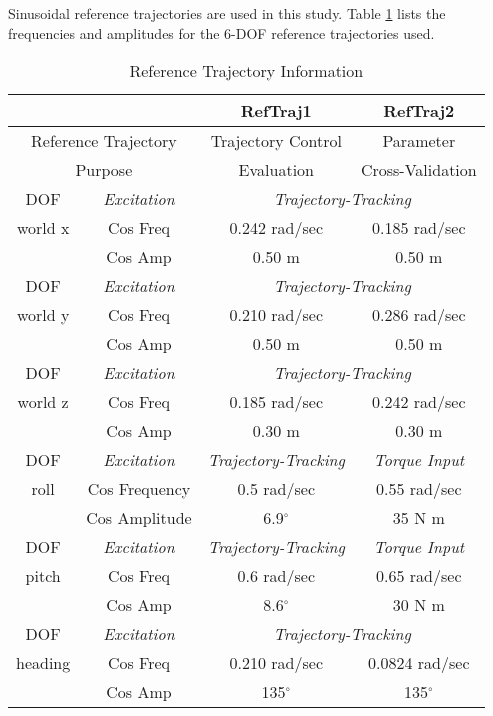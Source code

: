 Sinusoidal reference trajectories are used in this
study. 
%
Table \ref{chUV_AMBC.tb.expStat} lists the frequencies and amplitudes
for the 6-\ac{DOF} reference trajectories used.  


\begin{table}[htbp]
\ssp
\caption{Reference Trajectory Information}
\begin{center}
\begin{tabular}{cccc}
 & & RefTraj1& RefTraj2 \\
\hline
\multicolumn{2}{c}{Reference Trajectory}  &Trajectory Control      &  Parameter \\
\multicolumn{2}{c}{Purpose}              & Evaluation &  Cross-Validation \\
\hline
\ac{DOF}      & {\it Excitation} & \multicolumn{2}{c}{\it Trajectory-Tracking} \\
world x  &  Cos Freq  & 0.242 rad/sec & 0.185 rad/sec \\ 
         &  Cos Amp  &    0.50 m     &     0.50 m    \\ 
\hline
\ac{DOF}      & {\it Excitation} & \multicolumn{2}{c}{\it Trajectory-Tracking} \\
world y  &  Cos Freq  & 0.210 rad/sec & 0.286 rad/sec \\ 
         &  Cos Amp  &    0.50 m     &     0.50 m    \\ 
\hline
\ac{DOF}      & {\it Excitation} & \multicolumn{2}{c}{\it Trajectory-Tracking} \\
world z  &  Cos Freq  & 0.185 rad/sec & 0.242 rad/sec \\ 
         &  Cos Amp  &    0.30 m     &     0.30 m    \\ 
\hline
\ac{DOF}      & {\it Excitation} & {\it Trajectory-Tracking} & {\it Torque Input} \\
roll     &  Cos Frequency  & 0.5 rad/sec & 0.55 rad/sec \\ 
         &  Cos Amplitude  &    6.9$^\circ$    &     35 N m     \\ 
\hline
\ac{DOF}      & {\it Excitation} & {\it Trajectory-Tracking} & {\it Torque Input} \\
pitch    &  Cos Freq  & 0.6 rad/sec & 0.65 rad/sec \\ 
         &  Cos Amp  &    8.6$^\circ$    &     30 N m     \\ 
\hline
\ac{DOF}      & {\it Excitation} & \multicolumn{2}{c}{\it Trajectory-Tracking} \\
heading  &  Cos Freq  & 0.210 rad/sec & 0.0824 rad/sec \\ 
         &  Cos Amp  &    135$^\circ$  &   135$^\circ$   \\  
\hline \end{tabular}
\end{center}
\label{chUV_AMBC.tb.expStat}
\end{table}